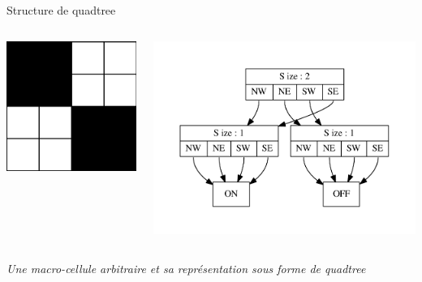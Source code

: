 \documentclass{beamer}
\begin{document}
\begin{frame}{Structure de quadtree}

  \begin{columns}[c]
    \begin{column}{2cm}
      \includegraphics[scale=0.2]{redudancy_ex.png}
    \end{column}

    \begin{column}{6cm}
      \includegraphics[scale=0.5]{redudancy.pdf}
    \end{column}

  \end{columns}
  
  \begin{center}
    \textit{Une macro-cellule arbitraire et sa représentation sous
      forme de quadtree}
    \end{center}
\end{frame}
\end{document}
